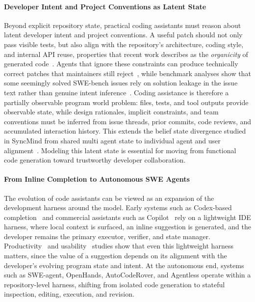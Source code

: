 \paragraph{Developer Intent and Project Conventions as Latent State}
Beyond explicit repository state, practical coding assistants must reason about
latent developer intent and project conventions. A useful patch should not only
pass visible tests, but also align with the repository's architecture, coding
style, and internal API reuse, properties that recent work describes as the
\emph{organicity} of generated code~\cite{li2026learning}. Agents that ignore
these constraints can produce technically correct patches that maintainers still
reject~\cite{li2026learning,thillen2026codetaste}, while benchmark analyses show
that some seemingly solved SWE-bench issues rely on solution leakage in the
issue text rather than genuine intent inference~\cite{aleithan2024swe}. Coding
assistance is therefore a partially observable program world problem: files,
tests, and tool outputs provide observable state, while design rationales,
implicit constraints, and team conventions must be inferred from issue threads,
prior commits, code reviews, and accumulated interaction history. This extends
the belief state divergence studied in SyncMind from shared multi agent state to
individual agent and user alignment~\cite{Guo2025SyncMind}. Modeling this latent
state is essential for moving from functional code generation toward trustworthy
developer collaboration.

\paragraph{From Inline Completion to Autonomous SWE Agents}
The evolution of code assistants can be viewed as an expansion of the development harness around the model.
Early systems such as Codex-based completion~\cite{chen2021evaluating} and commercial assistants such as Copilot~\cite{peng2023copilot} rely on a lightweight IDE harness, where local context is surfaced, an inline suggestion is generated, and the developer remains the primary executor, verifier, and state manager.
Productivity~\cite{peng2023copilot} and usability~\cite{vaithilingam2022expectation,mozannar2022reading} studies show that even this lightweight harness matters, since the value of a suggestion depends on its alignment with the developer's evolving program state and intent.
At the autonomous end, systems such as SWE-agent, OpenHands, AutoCodeRover, and Agentless operate within a repository-level harness, shifting from isolated code generation to stateful inspection, editing, execution, and revision.

